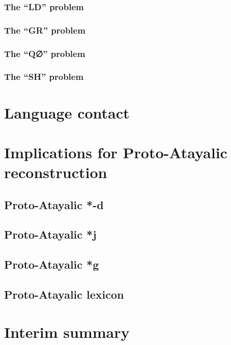 \documentclass[master]{NTHUthesis}
\begin{document}
\subsubsection{The ``LD'' problem}
\lipsum[1]
\subsubsection{The ``GR'' problem}
\lipsum[1]
\subsubsection{The ``Q∅'' problem}
\lipsum[1]
\subsubsection{The ``SH'' problem}
\lipsum[1]

\section{Language contact}
\lipsum[1]


\section{Implications for Proto-Atayalic reconstruction}
\lipsum[1]

\subsection{Proto-Atayalic *-d}
\lipsum[1]
\subsection{Proto-Atayalic *j}
\lipsum[1]
\subsection{Proto-Atayalic *g}
\lipsum[1]
\subsection{Proto-Atayalic lexicon}
\lipsum[1]

\section{Interim summary}
\lipsum[1]
\end{document}

